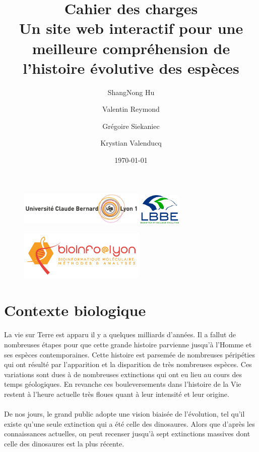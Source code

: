 \documentclass[a4paper]{article}
\title{{\sc \large Cahier des charges}\\
\bf Un site web interactif pour une meilleure compréhension de l’histoire évolutive des espèces}
\author{ShangNong {\sc Hu}\and Valentin {\sc Reymond}\and Grégoire {\sc Siekaniec}\and Krystian {\sc Valenducq}}
\date\today
\begin{document}
\begin{figure}[!t]
	\centering
	\includegraphics[width=6cm]{./img/ucbl.png}
	\hspace{\fill}
	\includegraphics[width=2cm]{./img/lbbe.png}
\end{figure}

\maketitle
\thispagestyle{empty}

\begin{figure}[!b]
	\centering
	\includegraphics[width=6cm]{./img/logo.png}
\end{figure}

\newpage

\tableofcontents
\newpage


\section{Contexte biologique}
	\paragraph{}
	La vie sur Terre est apparu il y a quelques milliards d'années. Il a fallut de nombreuses étapes pour que cette grande histoire parvienne jusqu'à l'Homme et ses espèces contemporaines. Cette histoire est parsemée de nombreuses péripéties qui ont résulté par l'apparition et la disparition de très nombreuses espèces. Ces variations sont dues à de nombreuses extinctions qui ont eu lieu au cours des temps géologiques. En revanche ces bouleversements dans l'histoire de la Vie restent à l'heure actuelle très floues quant à leur intensité et leur origine.

	\paragraph{}
	De nos jours, le grand public adopte une vision biaisée de l'évolution, tel qu'il existe qu'une seule extinction qui a été celle des dinosaures. Alors que d'après les connaissances actuelles, on peut recenser jusqu'à sept extinctions massives dont celle des dinosaures est la plus récente.
\end{document}
